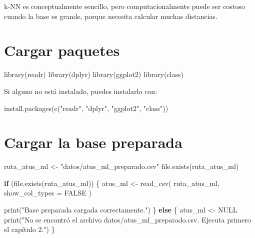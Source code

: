 \documentclass[
  11pt,
  letterpaper,
]{book}
\newenvironment{Shaded}{\begin{snugshade}}{\end{snugshade}}
\newcommand{\AttributeTok}[1]{\textcolor[rgb]{0.40,0.45,0.13}{#1}}
\newcommand{\ConstantTok}[1]{\textcolor[rgb]{0.56,0.35,0.01}{#1}}
\newcommand{\ControlFlowTok}[1]{\textcolor[rgb]{0.00,0.23,0.31}{\textbf{#1}}}
\newcommand{\FunctionTok}[1]{\textcolor[rgb]{0.28,0.35,0.67}{#1}}
\newcommand{\NormalTok}[1]{\textcolor[rgb]{0.00,0.23,0.31}{#1}}
\newcommand{\OtherTok}[1]{\textcolor[rgb]{0.00,0.23,0.31}{#1}}
\newcommand{\StringTok}[1]{\textcolor[rgb]{0.13,0.47,0.30}{#1}}
\begin{document}
k-NN es conceptualmente sencillo, pero computacionalmente puede ser
costoso cuando la base es grande, porque necesita calcular muchas
distancias.

\section{Cargar paquetes}\label{cargar-paquetes-3}

\begin{Shaded}
\begin{Highlighting}[]
\FunctionTok{library}\NormalTok{(readr)}
\FunctionTok{library}\NormalTok{(dplyr)}
\FunctionTok{library}\NormalTok{(ggplot2)}
\FunctionTok{library}\NormalTok{(class)}
\end{Highlighting}
\end{Shaded}

Si alguno no está instalado, puedes instalarlo con:

\begin{Shaded}
\begin{Highlighting}[]
\FunctionTok{install.packages}\NormalTok{(}\FunctionTok{c}\NormalTok{(}\StringTok{"readr"}\NormalTok{, }\StringTok{"dplyr"}\NormalTok{, }\StringTok{"ggplot2"}\NormalTok{, }\StringTok{"class"}\NormalTok{))}
\end{Highlighting}
\end{Shaded}

\section{Cargar la base preparada}\label{cargar-la-base-preparada-2}

\begin{Shaded}
\begin{Highlighting}[]
\NormalTok{ruta\_atus\_ml }\OtherTok{\textless{}{-}} \StringTok{"datos/atus\_ml\_preparado.csv"}
\FunctionTok{file.exists}\NormalTok{(ruta\_atus\_ml)}
\end{Highlighting}
\end{Shaded}

\begin{Shaded}
\begin{Highlighting}[]
\ControlFlowTok{if}\NormalTok{ (}\FunctionTok{file.exists}\NormalTok{(ruta\_atus\_ml)) \{}
\NormalTok{  atus\_ml }\OtherTok{\textless{}{-}} \FunctionTok{read\_csv}\NormalTok{(}
\NormalTok{    ruta\_atus\_ml,}
    \AttributeTok{show\_col\_types =} \ConstantTok{FALSE}
\NormalTok{  )}

  \FunctionTok{print}\NormalTok{(}\StringTok{"Base preparada cargada correctamente."}\NormalTok{)}
\NormalTok{\} }\ControlFlowTok{else}\NormalTok{ \{}
\NormalTok{  atus\_ml }\OtherTok{\textless{}{-}} \ConstantTok{NULL}
  \FunctionTok{print}\NormalTok{(}\StringTok{"No se encontró el archivo datos/atus\_ml\_preparado.csv. Ejecuta primero el capítulo 2."}\NormalTok{)}
\NormalTok{\}}
\end{Highlighting}
\end{Shaded}
\end{document}
